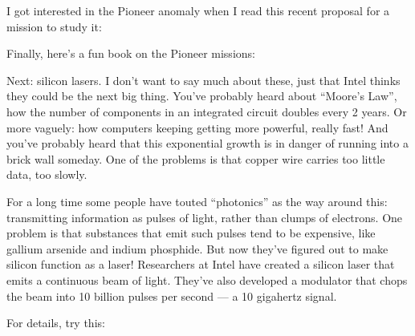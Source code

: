 \documentclass{article}
\def\tightlist{}
\renewcommand{\texttt}[1]{%
  \begingroup
  \ttfamily
  \begingroup\lccode`~=`/\lowercase{\endgroup\def~}{/\discretionary{}{}{}}%
  \begingroup\lccode`~=`[\lowercase{\endgroup\def~}{[\discretionary{}{}{}}%
  \begingroup\lccode`~=`.\lowercase{\endgroup\def~}{.\discretionary{}{}{}}%
  \catcode`/=\active\catcode`[=\active\catcode`.=\active
  \scantokens{#1\noexpand}%
  \endgroup
}
\begin{document}
I got interested in the Pioneer anomaly when I read this recent proposal
for a mission to study it:


Finally, here's a fun book on the Pioneer missions:


Next: silicon lasers. I don't want to say much about these, just that
Intel thinks they could be the next big thing. You've probably heard
about ``Moore's Law'', how the number of components in an integrated
circuit doubles every 2 years. Or more vaguely: how computers keeping
getting more powerful, really fast! And you've probably heard that this
exponential growth is in danger of running into a brick wall someday.
One of the problems is that copper wire carries too little data, too
slowly.

For a long time some people have touted ``photonics'' as the way around
this: transmitting information as pulses of light, rather than clumps of
electrons. One problem is that substances that emit such pulses tend to
be expensive, like gallium arsenide and indium phosphide. But now
they've figured out to make silicon function as a laser! Researchers at
Intel have created a silicon laser that emits a continuous beam of
light. They've also developed a modulator that chops the beam into 10
billion pulses per second --- a 10 gigahertz signal.

For details, try this:

\end{document}
